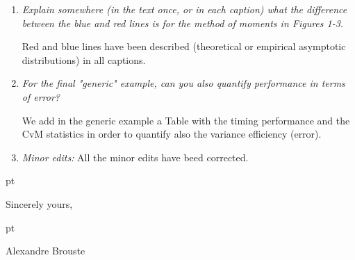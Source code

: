 \documentclass[11pt, a4paper]{article}
\begin{document}
\begin{enumerate}
\item {\it Explain somewhere (in the text once, or in each caption) what the
difference between the blue and red lines is for the method of moments
in Figures 1-3.}

Red and blue lines have been described  (theoretical or empirical asymptotic distributions) in all captions. 

\item {\it For the final "generic" example, can you also quantify performance in
terms of error?}

We add in the generic example a Table with the timing performance and the CvM statistics in order to quantify also the variance efficiency (error).

\item {\it Minor edits:} All the minor edits have beed corrected.
\end{enumerate}

\thispagestyle{empty}


 pt

\begin{flushright}
Sincerely yours,
\end{flushright}

 pt

\begin{flushright}
Alexandre Brouste 
\end{flushright}
\end{document}
